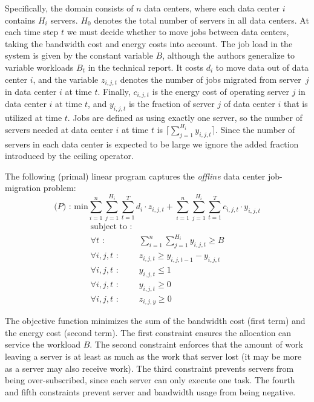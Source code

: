 Specifically, the domain consists of $n$ data centers, where each data center $i$ contains $H_i$ servers.
$H_0$ denotes the total number of servers in all data centers.
At each time step $t$ we must decide whether to move jobs between data centers, taking the bandwidth cost and energy costs into account.
The job load in the system is given by the constant variable $B$, although the authors generalize to variable workloads $B_{t}$ in the technical report.
It costs $d_i$ to move data out of data center $i$, and the variable $z_{i,j,t}$ denotes the number of jobs migrated from server~$j$ in data center $i$ at time $t$.
Finally, $c_{i,j,t}$ is the energy cost of operating server $j$ in data center $i$ at time $t$, and $y_{i,j,t}$ is the fraction of server $j$ of data center $i$ that is utilized at time $t$.
Jobs are defined as using exactly one server, so the number of servers needed at data center $i$ at time $t$ is $\lceil \sum^{H_i}_{j=1}y_{i,j,t} \rceil$.
Since the number of servers in each data center is expected to be large we ignore the added fraction introduced by the ceiling operator.

The following (primal) linear program captures the \emph{offline} data center job-migration problem:
\[
\textrm{($P$) : min}  \sum^n_{i=1}\sum^{H_i}_{j=1}\sum^{T}_{t=1}d_{i} \cdot z_{i,j,t} + \sum^{n}_{i=1}\sum^{H_{i}}_{j=1}\sum^{T}_{t=1} c_{i,j,t} \cdot y_{i,j,t}
\]
\[
	\begin{array}{rc}
	\textrm{subject to :} & \\
		\forall t \textrm{ :} & \sum^n_{i=1}\sum^{H_i}_{j=1}y_{i,j,t} \geq B \\
		\forall i,j,t \textrm{ :}	    & z_{i,j,t} \geq y_{i,j,t-1} - y_{i,j,t} \\
		\forall i,j,t \textrm{ :}	    & y_{i,j,t} \leq 1 \\
		\forall i,j,t \textrm{ :}	    & y_{i,j,t} \geq 0 \\
		\forall i,j,t \textrm{ :}	    & z_{i,j,y} \geq 0
	\end{array}
\]

The objective function minimizes the sum of the bandwidth cost (first term) and the energy cost (second term).
The first constraint ensures the allocation can service the workload $B$.
The second constraint enforces that the amount of work leaving a server is at least as much as the work that server lost (it may be more as a server may also receive work).
The third constraint prevents servers from being over-subscribed, since each server can only execute one task. 
The fourth and fifth constraints prevent server and bandwidth usage from being negative.


